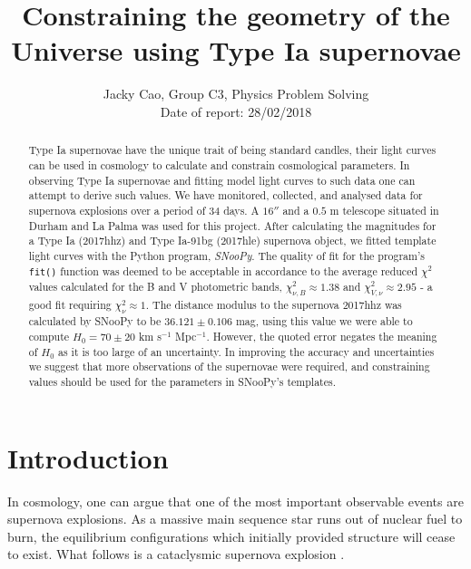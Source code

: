 \documentclass[twocolumn]{revtex4}
\begin{document}
\textheight=26.385cm

\title{Constraining the geometry of the Universe using Type Ia supernovae}
 
\author{Jacky Cao, Group C3, Physics Problem Solving \\ Date of report: 28/02/2018}

\begin{abstract}              
Type Ia supernovae have the unique trait of being standard candles, their light curves can be used in cosmology to calculate and constrain cosmological parameters. In observing Type Ia supernovae and fitting model light curves to such data one can attempt to derive such values. We have monitored, collected, and analysed data for supernova explosions over a period of 34 days. A $16''$ and a $0.5$ m telescope situated in Durham and La Palma was used for this project. After calculating the magnitudes for a Type Ia (2017hhz) and Type Ia-91bg (2017hle) supernova object, we fitted template light curves with the Python program, \textit{SNooPy}. The quality of fit for the program's \texttt{fit()} function was deemed to be acceptable in accordance to the average reduced $\chi^2$ values calculated for the B and V photometric bands, $\chi^2_{\nu,B} \approx 1.38$ and $\chi^2_{V,\nu} \approx 2.95$ - a good fit requiring $\chi^2_{\nu} \approx1$. The distance modulus to the supernova 2017hhz was calculated by SNooPy to be $36.121\pm0.106$ mag, using this value we were able to compute $H_0=70\pm20$ km s$^{-1}$ Mpc$^{-1}$. However, the quoted error negates the meaning of $H_0$ as it is too large of an uncertainty. In improving the accuracy and uncertainties we suggest that more observations of the supernovae were required, and constraining values should be used for the parameters in SNooPy's templates.
\end{abstract}

\maketitle

\vspace{-3ex}
\section{Introduction} 
\vspace{-2ex}
In cosmology, one can argue that one of the most important observable events are supernova explosions. As a massive main sequence star runs out of nuclear fuel to burn, the equilibrium configurations which initially provided structure will cease to exist. What follows is a cataclysmic supernova explosion \cite{longair}.
\end{document}
